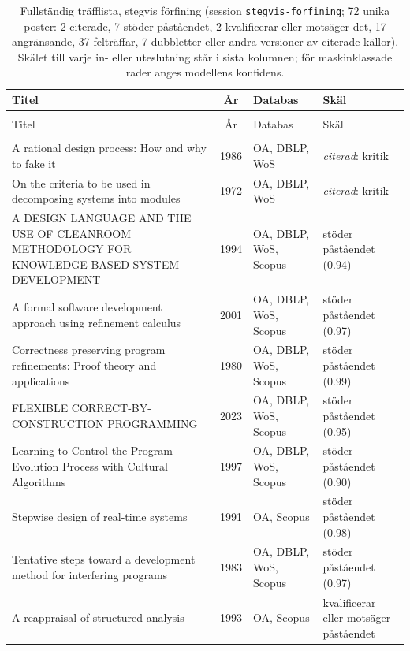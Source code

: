 \begingroup\footnotesize
\begin{longtable}{@{}%
  >{\raggedright\arraybackslash}p{}c%
  >{\raggedright\arraybackslash}p{}%
  >{\raggedright\arraybackslash}p{}@{}}
\caption{Fullständig träfflista, stegvis förfining (session \texttt{stegvis-forfining}; 72 unika poster: 2 citerade, 7 stöder påståendet, 2 kvalificerar eller motsäger det, 17 angränsande, 37 felträffar, 7 dubbletter eller andra versioner av citerade källor).  Skälet till varje in- eller uteslutning står i sista kolumnen; för maskinklassade rader anges modellens konfidens.}\label{tab:sok-stegvis}\\
\toprule
Titel & År & Databas & Skäl \\
\midrule
\endfirsthead
\multicolumn{4}{@{}l}{\emph{\tablename~\thetable{} (forts.)}}\\
\toprule Titel & År & Databas & Skäl \\ \midrule
\endhead
\midrule \multicolumn{4}{r@{}}{\emph{forts.\ på nästa sida}}\\
\endfoot
\bottomrule
\endlastfoot
A rational design process: How and why to fake it & 1986 & OA, DBLP, WoS & \emph{citerad}: kritik \\
On the criteria to be used in decomposing systems into modules & 1972 & OA, DBLP, WoS & \emph{citerad}: kritik \\
A DESIGN LANGUAGE AND THE USE OF CLEANROOM METHODOLOGY FOR KNOWLEDGE-BASED SYSTEM-DEVELOPMENT & 1994 & OA, DBLP, WoS, Scopus & stöder påståendet (0.94) \\
A formal software development approach using refinement calculus & 2001 & OA, DBLP, WoS, Scopus & stöder påståendet (0.97) \\
Correctness preserving program refinements: Proof theory and applications & 1980 & OA, DBLP, WoS, Scopus & stöder påståendet (0.99) \\
FLEXIBLE CORRECT-BY-CONSTRUCTION PROGRAMMING & 2023 & OA, DBLP, WoS, Scopus & stöder påståendet (0.95) \\
Learning to Control the Program Evolution Process with Cultural Algorithms & 1997 & OA, DBLP, WoS, Scopus & stöder påståendet (0.90) \\
Stepwise design of real-time systems & 1991 & OA, Scopus & stöder påståendet (0.98) \\
Tentative steps toward a development method for interfering programs & 1983 & OA, DBLP, WoS, Scopus & stöder påståendet (0.97) \\
A reappraisal of structured analysis & 1993 & OA, Scopus & kvalificerar eller motsäger påståendet \\

\end{longtable}
